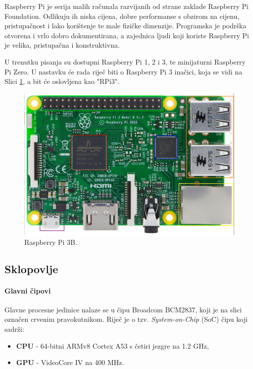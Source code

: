 \documentclass[12pt,a4paper]{article}
\begin{document}
Raspberry Pi je serija malih računala razvijanih od strane zaklade Raspberry Pi Foundation. Odlikuju ih niska cijena, dobre performanse s obzirom na cijenu, pristupačnost i lako korištenje te male fizičke dimenzije. Programska je podrška otvorena i vrlo dobro dokumentirana, a zajednica ljudi koji koriste Raspberry Pi je velika, pristupačna i konstruktivna. \\
\par
U trenutku pisanja su dostupni Raspberry Pi 1, 2 i 3, te minijaturni Raspberry Pi Zero. U nastavku će rada riječ biti o Raspberry Pi 3 inačici, koja se vidi na Slici \ref{fig:rpi3}, a bit će oslovljena kao "RPi3".
\begin{figure}[h!]
  \includegraphics[width=\linewidth]{slike/rpi3_color.png}
  \caption{Raspberry Pi 3B.}
  \label{fig:rpi3}
\end{figure}

	\subsection{Sklopovlje}
		\paragraph{Glavni čipovi} %
		\label{par:main_chips}
		
		Glavne procesne jedinice nalaze se u čipu Broadcom BCM2837, koji je na slici označen crvenim pravokutnikom. Riječ je o tzv. \textit{System-on-Chip} (SoC) čipu koji sadrži:
		\begin{itemize}
			\item \textbf{CPU} - 64-bitni ARMv8 Cortex A53 s četiri jezgre na 1.2 GHz,
			\item \textbf{GPU} - VideoCore IV na 400 MHz.
		\end{itemize}
\end{document}
